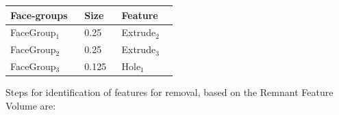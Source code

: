\begin{minipage}{0.9\textwidth}
\hfill
\begin{minipage}[c]{0.3\linewidth}
\begin{tabular}[h]{@{} p{0.4\linewidth} p{0.2\linewidth} p{0.3\linewidth}@{}} \toprule
\textbf{Face-groups} & \textbf{Size}& \textbf{Feature}\\ \midrule
FaceGroup$_1$ & 0.25 	&  Extrude$_2$\\
FaceGroup$_2$ & 0.25  & Extrude$_3$\\
FaceGroup$_3$ & 0.125 & Hole$_1$\\ \bottomrule
\end{tabular}
\label{tbl_clusters}
\end{minipage}

\end{minipage}



Steps for identification of features for removal, based on the Remnant Feature Volume are:


